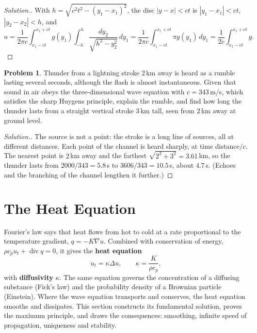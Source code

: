 \documentclass[11pt,a4paper]{article}
\numberwithin{equation}{section}
\theoremstyle{definition}
\newtheorem{problemx}{Problem}[subsection]
\newenvironment{problem}{\begin{problemx}}{\end{problemx}}
\newenvironment{solution}
  {\renewcommand{\qedsymbol}{}\begin{proof}[\textit{Solution}.]}
  {\end{proof}}
\begin{document}
\begin{solution}
With $h = \sqrt{c^2t^2 - (y_1 - x_1)^2}$, the disc $|y - x| < ct$ is $|y_1 - x_1| < ct$, $|y_2 - x_2| < h$, and
\[
u = \frac1{2\pi c}\int_{x_1 - ct}^{x_1 + ct}g(y_1)\int_{-h}^{h}\frac{dy_2}{\sqrt{h^2 - y_2^2}}\,dy_1 = \frac1{2\pi c}\int_{x_1 - ct}^{x_1 + ct}\pi g(y_1)\,dy_1 = \frac1{2c}\int_{x_1 - ct}^{x_1 + ct}g .
\]
\end{solution}

\begin{problem}
Thunder from a lightning stroke $2$\,km away is heard as a rumble lasting several seconds, although the flash is almost instantaneous. Given that sound in air obeys the three-dimensional wave equation with $c = 343$\,m/s, which satisfies the sharp Huygens principle, explain the rumble, and find
how long the thunder lasts from a straight vertical stroke $3$\,km tall, seen from $2$\,km away at ground level.
\end{problem}

\begin{solution}
The source is not a point: the stroke is a long line of sources, all at different distances. Each point of the channel is heard sharply, at time distance$/c$. The nearest point is $2$\,km away and the farthest $\sqrt{2^2 + 3^2} = 3.61$\,km, so the thunder lasts from $2000/343 = 5.8$\,s to $3606/343 = 10.5$\,s, about $4.7$\,s. (Echoes and the
branching of the channel lengthen it further.)
\end{solution}

\section{The Heat Equation}
\label{sec:heat}

Fourier's law says that heat flows from hot to cold at a rate proportional to the temperature gradient, $q = -K\nabla u$. Combined with conservation of energy, $\rho c_pu_t + \operatorname{div}q = 0$, it gives the \textbf{heat equation}
\begin{equation}
\label{eq:heat}
u_t = \kappa\Delta u, \qquad \kappa = \frac{K}{\rho c_p} ,
\end{equation}
with \textbf{diffusivity} $\kappa$. The same equation governs the concentration of a diffusing substance (Fick's law) and the probability density of a Brownian particle (Einstein). Where the wave equation transports and conserves, the heat equation smooths and dissipates. This section
constructs its fundamental solution, proves the maximum principle, and draws the consequences: smoothing, infinite speed of propagation, uniqueness and stability.
\end{document}
